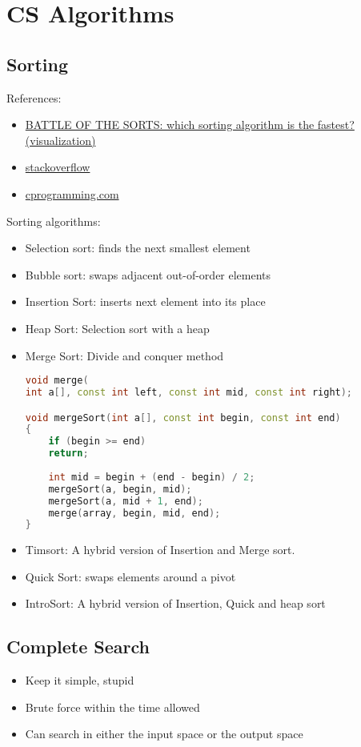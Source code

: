 \chapter{CS Algorithms}

\section{Sorting}

References:
\begin{itemize}
	\item \href{https://youtu.be/OOBBI-kSChM}{BATTLE OF THE SORTS: which sorting algorithm is the fastest? (visualization)}
	\item \href{https://stackoverflow.com/q/5038895/11397588}{stackoverflow}
	\item \href{https://www.cprogramming.com/tutorial/computersciencetheory/sortcomp.html}{cprogramming.com}
\end{itemize}

Sorting algorithms:
\begin{itemize}
	\item Selection sort: finds the next smallest element
	\item Bubble sort: swaps adjacent out-of-order elements
	\item Insertion Sort: inserts next element into its place
	\item Heap Sort: Selection sort with a heap
	\item Merge Sort: Divide and conquer method
\begin{lstlisting}[language=C++]
void merge(
int a[], const int left, const int mid, const int right);	

void mergeSort(int a[], const int begin, const int end)
{
	if (begin >= end)
	return;
	
	int mid = begin + (end - begin) / 2;
	mergeSort(a, begin, mid);
	mergeSort(a, mid + 1, end);
	merge(array, begin, mid, end);
}
\end{lstlisting}
	\item Timsort: A hybrid version of Insertion and Merge sort.
	\item Quick Sort: swaps elements around a pivot
	\item IntroSort: A hybrid version of Insertion, Quick and heap sort
\end{itemize}

\section{Complete Search}
\begin{itemize}
	\item Keep it simple, stupid
	\item Brute force within the time allowed
	\item Can search in either the input space or the output space
\end{itemize}

